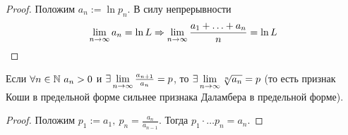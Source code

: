 \begin{proof}
	Положим $a_n := \ln p_n$. В силу непрерывности
	\[
		\lim\limits_{n \to \infty} a_n = \ln L \Rightarrow \lim\limits_{n \to \infty} \frac{a_1 + \ldots + a_n}{n} = \ln L
	\]
\end{proof}

\begin{corollary}
	Если $\forall n \in \mathbb{N}\ a_n > 0$ и $\exists \lim\limits_{n \to \infty} \frac{a_{n + 1}}{a_n} = p$, то $\exists \lim\limits_{n \to \infty} \sqrt[n]{a_n} = p$ (то есть признак Коши в предельной форме сильнее признака Даламбера в предельной форме).
\end{corollary}

\begin{proof}
	Положим $p_1 := a_1,\ p_n = \frac{a_n}{a_{n - 1}}$. Тогда $p_1 \cdot \ldots p_n = a_n$.
\end{proof}